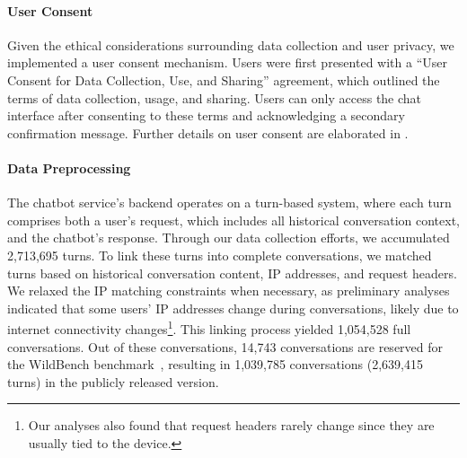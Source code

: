 \documentclass{article} %
\begin{document}
\paragraph{User Consent}
Given the ethical considerations surrounding data collection and user privacy, we implemented a user consent mechanism. Users were first presented with a ``User Consent for Data Collection, Use, and Sharing'' agreement, which outlined the terms of data collection, usage, and sharing. Users can only access the chat interface after consenting to these terms and acknowledging a secondary confirmation message. Further details on user consent are elaborated in .

\paragraph{Data Preprocessing}
The chatbot service's backend operates on a turn-based system, where each turn comprises both a user's request, which includes all historical conversation context, and the chatbot's response. Through our data collection efforts, we accumulated 2,713,695 turns. To link these turns into complete conversations, we matched turns based on historical conversation content, IP addresses, and request headers. We relaxed the IP matching constraints when necessary, as preliminary analyses indicated that some users’ IP addresses change during conversations, likely due to internet connectivity changes\footnote{Our analyses also found that request headers rarely change since they are usually tied to the device.}. This linking process yielded 1,054,528 full conversations. Out of these conversations, 14,743 conversations are reserved for the WildBench benchmark~\citep{wildbench2024}, resulting in 1,039,785 conversations (2,639,415 turns) in the publicly released version.

\end{document}
